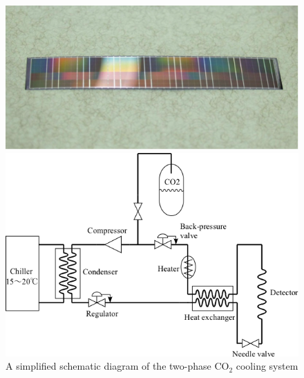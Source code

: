 \begin{figure}
 \begin{minipage}{0.49\textwidth}
    \centering
    \includegraphics*[width=\textwidth,keepaspectratio]{VertexDetector/FPCCD/realSizeFPCCDSensor.png}
    \caption{Real size FPCCD sensor thinned down to \SI{50}{\micro\meter}}
    \label{fig:FPCCD:realSizeSensor}
 \end{minipage}
 \hfill
 \begin{minipage}{0.49\textwidth}
    \centering
    \includegraphics*[width=\textwidth,keepaspectratio]{VertexDetector/FPCCD/coolingSystemSchematic.png}
    \caption{A simplified schematic diagram of the two-phase $\text{CO}_2$ cooling system}
    \label{fig:FPCCD:coolingSystemSchematic}
 \end{minipage}
 \end{figure}

